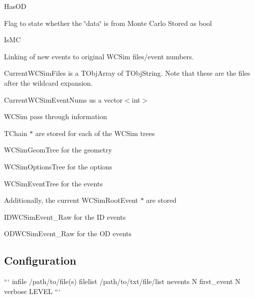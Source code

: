 \begin{DoxyItemize}
\begin{DoxyItemize}
\begin{DoxyItemize}
\item {\ttfamily Has\-O\-D}
\end{DoxyItemize}
\item Flag to state whether the \char`\"{}data\char`\"{} is from Monte Carlo Stored as {\ttfamily bool}
\begin{DoxyItemize}
\item {\ttfamily Is\-M\-C}
\end{DoxyItemize}
\item Linking of new events to original W\-C\-Sim files/event numbers.
\begin{DoxyItemize}
\item {\ttfamily Current\-W\-C\-Sim\-Files} is a {\ttfamily T\-Obj\-Array} of {\ttfamily T\-Obj\-String}. Note that these are the files after the wildcard expansion.
\item {\ttfamily Current\-W\-C\-Sim\-Event\-Nums} us a {\ttfamily vector$<$int$>$}
\end{DoxyItemize}
\item W\-C\-Sim pass through information
\begin{DoxyItemize}
\item {\ttfamily T\-Chain $\ast$} are stored for each of the W\-C\-Sim trees
\begin{DoxyItemize}
\item {\ttfamily W\-C\-Sim\-Geom\-Tree} for the geometry
\item {\ttfamily W\-C\-Sim\-Options\-Tree} for the options
\item {\ttfamily W\-C\-Sim\-Event\-Tree} for the events
\end{DoxyItemize}
\item Additionally, the current {\ttfamily W\-C\-Sim\-Root\-Event $\ast$} are stored
\begin{DoxyItemize}
\item {\ttfamily I\-D\-W\-C\-Sim\-Event\-\_\-\-Raw} for the I\-D events
\item {\ttfamily O\-D\-W\-C\-Sim\-Event\-\_\-\-Raw} for the O\-D events
\end{DoxyItemize}
\end{DoxyItemize}
\end{DoxyItemize}
\end{DoxyItemize}

\subsection*{Configuration}

``` infile /path/to/file(s) filelist /path/to/txt/file/list nevents N first\-\_\-event N verbose L\-E\-V\-E\-L ```


